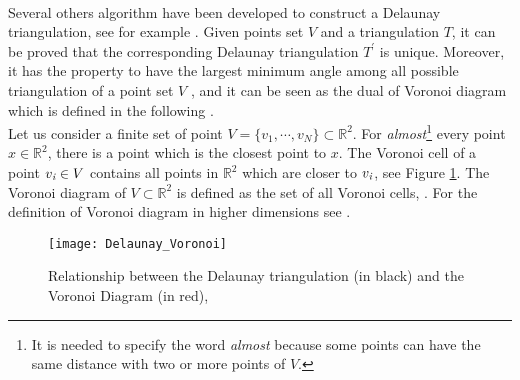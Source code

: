 \\ \indent Several others algorithm have been developed to construct a Delaunay triangulation, see for example \cite{lee1980two, renka1997algorithm}.
 Given points set $V$ and a triangulation $T$, it can be proved that the corresponding Delaunay triangulation $T^\prime$ is unique. Moreover, it has the property to have the largest minimum angle among all possible triangulation of a point set $V$ \cite{press2007numerical}, and it can be seen as the dual of Voronoi diagram which is defined in the following \cite{fortune1992voronoi}.\\\indent 
Let us consider a finite set of point $V = \{v_1, \cdots, v_N\}\subset \mathbb{R}^2$. For \textit{almost}\footnote{It is needed to specify the word \textit{almost} because some points can have the same distance with two or more points of $V$.} every point $x\in \mathbb{R}^2$, there is a point which is the closest point to $x$. The Voronoi cell of a point $v_{\textit{i}}\in V$ contains all points in $\mathbb{R}^2$ which are closer to $v_{\textit{i}}$, see Figure \ref{fig:Voronoi}. 
The Voronoi diagram of $V\subset \mathbb{R}^2$ is defined as the set of all Voronoi cells, \cite{cazals2005conformal}.  For the definition of Voronoi diagram in higher dimensions see \cite{brown1979voronoi}.
\begin{figure}[h]
\centering
\texttt{[image: Delaunay\_Voronoi]}
\caption{Relationship between the Delaunay triangulation (in black) and the Voronoi Diagram (in red), \cite{Wiki4}}
\label{fig:Voronoi}
\end{figure}
